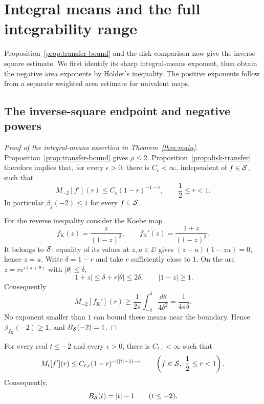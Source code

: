\section{Integral means and the full integrability range}
\label{sec:integrability}

Proposition~\ref{prop:transfer-bound} and the disk comparison now
give the inverse-square estimate.  We first identify its sharp
integral-means exponent, then obtain the negative area exponents by
H\"older's inequality.  The positive exponents follow from a
separate weighted area estimate for univalent maps.

\subsection{The inverse-square endpoint and negative powers}

\begin{proof}[Proof of the integral-means assertion in Theorem~\ref{thm:main}]
 Proposition~\ref{prop:transfer-bound} gives $\rho\leq2$.
 Proposition~\ref{prop:disk-transfer} therefore implies that, for every
 $\epsilon>0$, there is $C_\epsilon<\infty$, independent of
 $f\in\mathcal S$, such that
 \begin{equation}\label{eq:final-inverse-means}
  M_{-2}[f'](r)\leq C_\epsilon(1-r)^{-1-\epsilon},
  \qquad \frac12\leq r<1.
 \end{equation}
 In particular $\beta_f(-2)\leq1$ for every $f\in\mathcal S$.

 For the reverse inequality consider the Koebe map
 \[
  f_{\mathrm K}(z)=\frac{z}{(1-z)^2},\qquad
  f_{\mathrm K}'(z)=\frac{1+z}{(1-z)^3}.
 \]
 It belongs to $\mathcal S$: equality of its values at $z,u\in\DD$
 gives $(z-u)(1-zu)=0$, hence $z=u$.
 Write $\delta=1-r$ and take $r$ sufficiently close to $1$.
 On the arc $z=re^{i(\pi+\theta)}$ with $|\theta|\leq\delta$,
 \[
  |1+z|\leq\delta+r|\theta|\leq2\delta,\qquad |1-z|\geq1.
 \]
 Consequently
 \[
  M_{-2}[f_{\mathrm K}'](r)
    \geq \frac1{2\pi}\int_{-\delta}^{\delta}
                      \frac{d\theta}{4\delta^2}
    =\frac1{4\pi\delta}.
 \]
 No exponent smaller than $1$ can bound these means near the
 boundary.  Hence $\beta_{f_{\mathrm K}}(-2)\geq1$, and
 $B_{\mathcal S}(-2)=1$.
\end{proof}

\begin{corollary}\label{cor:negative-linear-tail}
For every real $t\leq-2$ and every $\epsilon>0$, there is
$C_{t,\epsilon}<\infty$ such that
\begin{equation}\label{eq:negative-linear-tail}
 M_t[f'](r)\leq C_{t,\epsilon}(1-r)^{-(|t|-1)-\epsilon}
 \qquad\left(f\in\mathcal S,\ \frac12\leq r<1\right).
\end{equation}
Consequently,
\[
 B_{\mathcal S}(t)=|t|-1\qquad(t\leq-2).
\]
\end{corollary}

